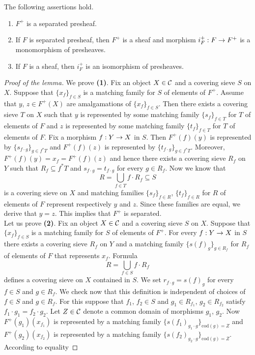 \begin{lemma}\label{lemma:plusconstruction}
The following assertions hold.
\begin{enumerate}[label=\emph{\textbf{(\arabic*)}}, leftmargin=3.0em]
\item $F^+$ is a separated presheaf.
\item If $F$ is separated presheaf, then $F^+$ is a sheaf and morphism $i^+_F:F\rightarrow F^+$ is a monomorphism of presheaves.
\item If $F$ is a sheaf, then $i^+_F$ is an isomorphism of presheaves.
\end{enumerate}
\end{lemma}
\begin{proof}[Proof of the lemma]
We prove \textbf{(1)}. Fix an object $X\in {\mathcal C}$ and a covering sieve $S$ on $X$. Suppose that $\{x_f\}_{f\in S}$ is a matching family for $S$ of elements of $F^+$. Assume that $y$, $z\in F^+(X)$ are amalgamations of $\{x_f\}_{f\in S}$. Then there exists a covering sieve $T$ on $X$ such that $y$ is represented by some matching family $\{s_f\}_{f\in T}$ for $T$ of elements of $F$ and $z$ is represented by some matching family $\{t_f\}_{f\in T}$ for $T$ of elements of $F$. Fix a morphism $f:Y\rightarrow X$ in $S$. Then $F^+(f)(y)$ is represented by $\{s_{f\cdot g}\}_{g\in f^*T}$ and $F^+(f)(z)$ is represented by $\{t_{f\cdot g}\}_{g\in f^*T}$. Moreover, $F^+(f)(y)=x_f=F^+(f)(z)$ and hence there exists a covering sieve $R_f$ on $Y$ such that $R_f\subseteq f^*T$ and $s_{f\cdot g}=t_{f\cdot g}$ for every $g\in R_f$. Now we know that 
$$R=\bigcup_{f\in T}f\cdot R_f\subseteq S$$
is a covering sieve on $X$ and matching families $\{s_f\}_{f\in R}$, $\{t_f\}_{f\in R}$ for $R$ of elements of $F$ represent respectively $y$ and $z$. Since these families are equal, we derive that $y=z$. This implies that $F^+$ is separated.\\
Let us prove \textbf{(2)}. Fix an object $X\in {\mathcal C}$ and a covering sieve $S$ on $X$. Suppose that $\{x_f\}_{f\in S}$ is a matching family for $S$ of elements of $F^+$. For every $f:Y\rightarrow X$ in $S$ there exists a covering sieve $R_f$ on $Y$ and a matching family $\{s(f)_g\}_{g\in R_f}$ for $R_f$ of elements of $F$ that represents $x_f$. Formula
$$R=\bigcup_{f\in S}f\cdot R_f$$
defines a covering sieve on $X$ contained in $S$. We set $r_{f\cdot g}=s(f)_g$ for every $f\in S$ and $g\in R_f$. We check now that this definition is independent of choices of $f\in S$ and $g\in R_f$. For this suppose that $f_1$, $f_2\in S$ and $g_1\in R_{f_1}$, $g_2\in R_{f_2}$ satisfy $f_1\cdot g_1=f_2\cdot g_2$. Let $Z\in {\mathcal C}$ denote a common domain of morphisms $g_1$, $g_2$. Now $F^+(g_1)(x_{f_1})$ is represented by a matching family $\{s(f_1)_{g_1\cdot g}\}_{\mathrm{cod}(g)=Z}$ and $F^+(g_2)(x_{f_2})$ is represented by a matching family $\{s(f_2)_{g_2\cdot g}\}_{\mathrm{cod}(g)=Z}$. According to equality

\end{proof}
